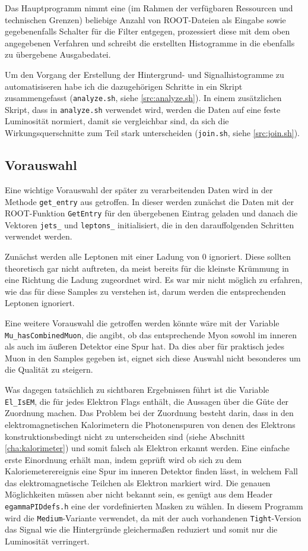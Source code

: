Das Hauptprogramm nimmt eine (im Rahmen der verfügbaren Ressourcen und
technischen Grenzen) beliebige Anzahl von ROOT-Dateien als Eingabe sowie
gegebenenfalls Schalter für die Filter entgegen, prozessiert diese mit dem oben
angegebenen Verfahren und schreibt die erstellten Histogramme in die ebenfalls
zu übergebene Ausgabedatei.

Um den Vorgang der Erstellung der Hintergrund- und Signalhistogramme zu
automatisiseren habe ich die dazugehörigen Schritte in ein Skript
zusammengefasst (\verb'analyze.sh', siehe \ref{src:analyze.sh}). In einem
zusätzlichen Skript, dass in \verb'analyze.sh' verwendet wird, werden die Daten
auf eine feste Luminosität normiert, damit sie vergleichbar sind, da sich die
Wirkungsquerschnitte zum Teil stark unterscheiden (\verb'join.sh', siehe
\ref{src:join.sh}).

\subsection{Vorauswahl}
Eine wichtige Vorauswahl der später zu verarbeitenden Daten wird in der Methode
\lstinline'get_entry' aus  getroffen. In dieser werden zunächst
die Daten mit der ROOT-Funktion \lstinline'GetEntry' für den übergebenen Eintrag
geladen und danach die Vektoren \lstinline'jets_' und \lstinline'leptons_'
initialisiert, die in den darauffolgenden Schritten verwendet werden.

Zunächst werden alle Leptonen mit einer Ladung von $0$ ignoriert. Diese sollten
theoretisch gar nicht auftreten, da meist bereits für die kleinste Krümmung in
eine Richtung die Ladung zugeordnet wird. Es war mir nicht möglich zu erfahren,
wie das für diese Samples zu verstehen ist, darum werden die entsprechenden
Leptonen ignoriert.

Eine weitere Vorauswahl die getroffen werden könnte wäre mit der Variable
\lstinline'Mu_hasCombinedMuon', die angibt, ob das entsprechende Myon sowohl im
inneren als auch im äußeren Detektor eine Spur hat. Da dies aber für praktisch
jedes Muon in den Samples gegeben ist, eignet sich diese Auswahl nicht
besonderes um die Qualität zu steigern.

Was dagegen tatsächlich zu sichtbaren Ergebnissen führt ist die Variable
\lstinline'El_IsEM', die für jedes Elektron Flags enthält, die Aussagen über die
Güte der Zuordnung machen. Das Problem bei der Zuordnung besteht darin, dass in
den elektromagnetischen Kalorimetern die Photonenspuren von denen des Elektrons
konstruktionsbedingt nicht zu unterscheiden sind (siehe Abschnitt
\ref{cha:kalorimeter}) und somit falsch als Elektron erkannt werden. Eine
einfache erste Einordnung erhält man, indem geprüft wird ob sich zu dem
Kaloriemeterereignis eine Spur im inneren Detektor finden lässt, in welchem Fall
das elektromagnetische Teilchen als Elektron markiert wird. Die genauen
Möglichkeiten müssen aber nicht bekannt sein, es genügt aus dem Header
\texttt{egammaPIDdefs.h} eine der vordefinierten Masken zu wählen. In diesem
Programm wird die \lstinline'Medium'-Variante verwendet, da mit der auch
vorhandenen \lstinline'Tight'-Version das Signal wie die Hintergründe
gleichermaßen reduziert und somit nur die Luminosität verringert.

